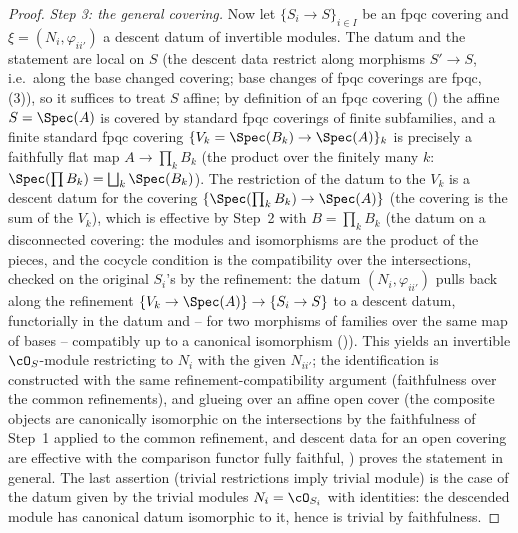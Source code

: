 \begin{proof}
\emph{Step 3: the general covering.}  Now let $\{S_i\to S\}_{i\in I}$ be
an fpqc covering and $\xi=(N_i,\varphi_{ii'})$ a descent datum of
invertible modules.  The datum and the statement are local on $S$
(the descent data restrict along morphisms $S'\to S$, i.e.\ along the
base changed covering; base changes of fpqc coverings are fpqc,
(3)), so it suffices
to treat $S$ affine; by definition of an fpqc covering
() the affine
$S=\Spec(A)$ is covered by standard fpqc coverings of finite
subfamilies, and a finite standard fpqc covering
$\{V_k=\Spec(B_k)\to\Spec(A)\}_k$ is precisely a faithfully flat map
$A\to\prod_kB_k$ (the product over the finitely many $k$:
$\Spec(\prod B_k)=\bigsqcup_k\Spec(B_k)$).  The restriction of the
datum to the $V_k$ is a descent datum for the covering
$\{\Spec(\prod_kB_k)\to\Spec(A)\}$ (the covering is the sum of the
$V_k$), which is effective by Step~2 with
$B=\prod_kB_k$ (the datum on a disconnected covering: the modules and
isomorphisms are the product of the pieces, and the cocycle condition
is the compatibility over the intersections, checked on the original
$S_i$'s by the refinement: the datum $(N_i,\varphi_{ii'})$ pulls back
along the refinement $\{V_k\to\Spec(A)\}\to\{S_i\to S\}$ to a descent
datum, functorially in the datum and -- for two morphisms of families
over the same map of bases -- compatibly up to a canonical isomorphism
()).  This yields an invertible
$\cO_S$-module restricting to $N_i$ with the given $N_{ii'}$; the
identification is constructed with the same refinement-compatibility
argument (faithfulness over the common refinements), and glueing over
an affine open cover (the composite objects are canonically isomorphic
on the intersections by the faithfulness of Step~1 applied to the
common refinement, and descent data for an open covering are effective
with the comparison functor fully faithful,
) proves the statement in general.
The last assertion (trivial restrictions imply trivial module) is the case of the datum
given by the trivial modules $N_i=\cO_{S_i}$ with identities: the
descended module has canonical datum isomorphic to it, hence is
trivial by faithfulness.
\end{proof}

